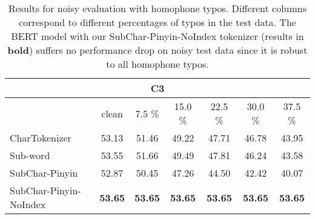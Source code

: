 \begin{table*}[t]
{\begin{tabular}{ lcccccc }
    \bottomrule
    \multicolumn{7}{c}{C3} \\
    \hline
     & clean
     & 7.5 \%
     & 15.0 \%
     & 22.5 \% 
     & 30.0 \%
     & 37.5 \%
     \\
    \hline 
    CharTokenizer   & 53.13 & 51.46 & 49.22 & 47.71 & 46.78 & 43.95 \\
    Sub-word           & 53.55 & 51.66 & 49.49 & 47.81 & 46.24 & 43.58 \\
    SubChar-Pinyin          & 52.87 & 50.45 & 47.26 & 44.50 & 42.42 & 40.07 \\
    SubChar-Pinyin-NoIndex  & \textbf{53.65} & \textbf{53.65} & \textbf{53.65} & \textbf{53.65} & \textbf{53.65} & \textbf{53.65} \\
    \bottomrule
    \end{tabular}}
    \caption{Results for noisy evaluation with homophone typos. Different columns correspond to different percentages of typos in the test data. The BERT model with our SubChar-Pinyin-NoIndex tokenizer (results in \textbf{bold}) suffers no performance drop on noisy test data since it is robust to all homophone typos.}
    \label{tab:noisy_results_phonology}
    \end{table*}